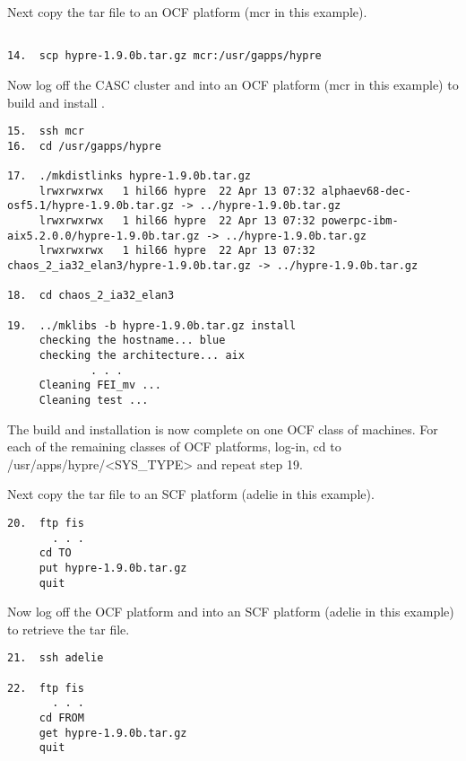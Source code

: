 Next copy the tar file to an OCF platform (mcr in this example).
\begin{verbatim}

14.  scp hypre-1.9.0b.tar.gz mcr:/usr/gapps/hypre

\end{verbatim}

Now log off the CASC cluster and into an OCF platform (mcr in this example) to build and 
install \hypre{}.
\begin{verbatim}
15.  ssh mcr
16.  cd /usr/gapps/hypre

17.  ./mkdistlinks hypre-1.9.0b.tar.gz
     lrwxrwxrwx   1 hil66 hypre  22 Apr 13 07:32 alphaev68-dec-osf5.1/hypre-1.9.0b.tar.gz -> ../hypre-1.9.0b.tar.gz
     lrwxrwxrwx   1 hil66 hypre  22 Apr 13 07:32 powerpc-ibm-aix5.2.0.0/hypre-1.9.0b.tar.gz -> ../hypre-1.9.0b.tar.gz
     lrwxrwxrwx   1 hil66 hypre  22 Apr 13 07:32 chaos_2_ia32_elan3/hypre-1.9.0b.tar.gz -> ../hypre-1.9.0b.tar.gz

18.  cd chaos_2_ia32_elan3

19.  ../mklibs -b hypre-1.9.0b.tar.gz install
     checking the hostname... blue
     checking the architecture... aix
             . . .
     Cleaning FEI_mv ...
     Cleaning test ...
\end{verbatim}
The build and installation is now complete on one OCF class of machines. For each of the
remaining classes of OCF platforms, log-in, cd to /usr/apps/hypre/<SYS\_TYPE> and repeat
step 19.

Next copy the tar file to an SCF platform (adelie in this example).
\begin{verbatim}
20.  ftp fis
       . . . 
     cd TO
     put hypre-1.9.0b.tar.gz
     quit
\end{verbatim}

Now log off the OCF platform and into an SCF platform (adelie in this example) to retrieve
the tar file.
\begin{verbatim}
21.  ssh adelie

22.  ftp fis
       . . . 
     cd FROM
     get hypre-1.9.0b.tar.gz
     quit
\end{verbatim}

